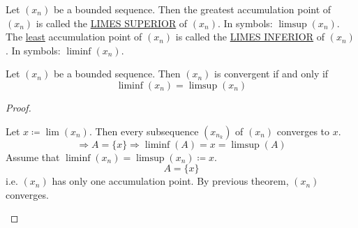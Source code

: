 \documentclass[class=scrartcl, crop=false]{standalone}
\begin{document}
\begin{definition}
  \begin{enumerate}
    \ii[]
    \ii
    Let $(x_n)$ be a bounded sequence. Then the greatest accumulation point of $(x_n)$ is called the \ul{LIMES SUPERIOR} of $(x_n)$. In symbols: $\limsup(x_n)$.
    \ii
    The \ul{least} accumulation point of $(x_n)$ is called the \ul{LIMES INFERIOR} of $(x_n)$. In symbols: $\liminf(x_n)$.
  \end{enumerate}
\end{definition}

\begin{theorem}
  Let $(x_n)$ be a bounded sequence. Then $(x_n)$ is convergent if and only if 
  \[
    \liminf(x_n) = \limsup(x_n)
  \]
  \begin{proof}
    \begin{itemize}
      \ii[]
      \ii[$(\Rightarrow)$ ]
      Let $x \coloneqq \lim(x_n)$. Then every subsequence $(x_{n_k})$ of $(x_n)$ converges to $x$. 
      \[
        \Rightarrow A = \{x\} \Rightarrow \liminf(A) = x = \limsup(A)
      \]
      \ii[$(\Leftarrow)$ ]
      Assume that $\liminf(x_n) = \limsup(x_n) \coloneqq x$. 
      \[
        A = \{x\}
      \]
      i.e. $(x_n)$ has only one accumulation point. By previous theorem, $(x_n)$ converges.
    \end{itemize}
  \end{proof}
\end{theorem}
\end{document}
